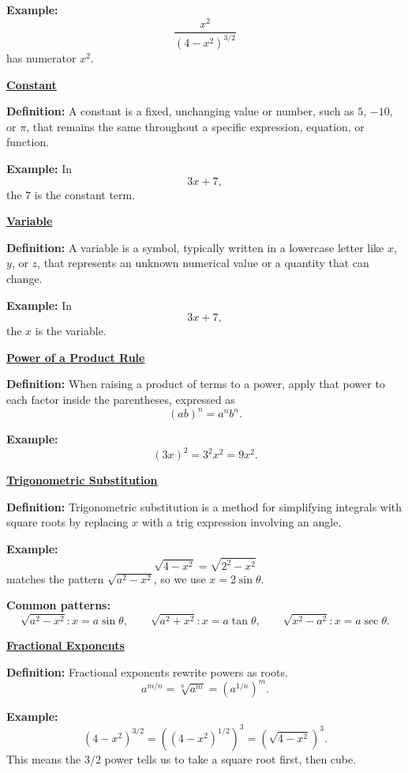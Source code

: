 \documentclass{article}
\newcommand{\defanchor}[1]{\hypertarget{def:#1}{}}
\newcommand{\backtoterm}[2]{\hyperlink{q:#1}{\textbf{#2}}}
\begin{document}
    \textbf{Example:}
    \[
    \frac{x^2}{(4-x^2)^{3/2}}
    \]
    has numerator $x^2$.

    \defanchor{constant}\backtoterm{constant}{Constant}

    \textbf{Definition:}
    A constant is a fixed, unchanging value or number, such as $5$, $-10$, or $\pi$, that remains the same throughout a specific expression, equation, or function.

    \textbf{Example:}
    In
    \[
    3x+7,
    \]
    the $7$ is the constant term.

    \defanchor{variable}\backtoterm{variable}{Variable}

    \textbf{Definition:}
    A variable is a symbol, typically written in a lowercase letter like $x$, $y$, or $z$, that represents an unknown numerical value or a quantity that can change.

    \textbf{Example:}
    In
    \[
    3x+7,
    \]
    the $x$ is the variable.

    \defanchor{prod-power}\backtoterm{prod-power}{Power of a Product Rule}

    \textbf{Definition:}
    When raising a product of terms to a power, apply that power to each factor inside the parentheses, expressed as
    \[
    (ab)^n = a^n b^n.
    \]

    \textbf{Example:}
    \[
    (3x)^2=3^2x^2=9x^2.
    \]

    \defanchor{trig-sub}\backtoterm{trig-sub}{Trigonometric Substitution}

    \textbf{Definition:}
    Trigonometric substitution is a method for simplifying integrals with square roots by replacing $x$
    with a trig expression involving an angle.

    \textbf{Example:}
    \[
    \sqrt{4-x^2}=\sqrt{2^2-x^2}
    \]
    matches the pattern $\sqrt{a^2-x^2}$, so we use $x=2\sin\theta$.

    \textbf{Common patterns:}
    \[
    \sqrt{a^2-x^2}: x=a\sin\theta,\qquad
    \sqrt{a^2+x^2}: x=a\tan\theta,\qquad
    \sqrt{x^2-a^2}: x=a\sec\theta.
    \]

    \defanchor{frac-exp}\backtoterm{frac-exp}{Fractional Exponents}

    \textbf{Definition:}
    Fractional exponents rewrite powers as roots.
    \[
    a^{m/n}=\sqrt[n]{a^m}=\left(a^{1/n}\right)^m.
    \]

    \textbf{Example:}
    \[
    (4-x^2)^{3/2}=\left((4-x^2)^{1/2}\right)^3=\left(\sqrt{4-x^2}\right)^3.
    \]
    This means the $3/2$ power tells us to take a square root first, then cube.
\end{document}
